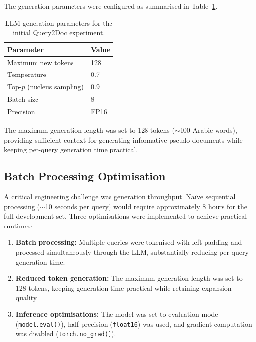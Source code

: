 The generation parameters were configured as summarised in Table~\ref{tab:q2d_params}.

\begin{table}[htbp]
    \centering
    \caption[Initial Query2Doc generation parameters]{LLM generation parameters for the initial Query2Doc experiment.}
    \label{tab:q2d_params}
    \begin{tabular}{@{}ll@{}}
        \toprule
        \textbf{Parameter} & \textbf{Value} \\
        \midrule
        Maximum new tokens & 128 \\
        Temperature & 0.7 \\
        Top-$p$ (nucleus sampling) & 0.9 \\
        Batch size & 8 \\
        Precision & FP16 \\
        \bottomrule
    \end{tabular}
\end{table}

The maximum generation length was set to 128 tokens ($\sim$100 Arabic words), providing sufficient context for generating informative pseudo-documents while keeping per-query generation time practical.

\subsection{Batch Processing Optimisation}
\label{sec:meth_q2d_batch}

A critical engineering challenge was generation throughput. Na\"ive sequential processing ($\sim$10 seconds per query) would require approximately 8 hours for the full development set. Three optimisations were implemented to achieve practical runtimes:

\begin{enumerate}
    \item \textbf{Batch processing:} Multiple queries were tokenised with left-padding and processed simultaneously through the LLM, substantially reducing per-query generation time.
    \item \textbf{Reduced token generation:} The maximum generation length was set to 128 tokens, keeping generation time practical while retaining expansion quality.
    \item \textbf{Inference optimisations:} The model was set to evaluation mode (\texttt{model.eval()}), half-precision (\texttt{float16}) was used, and gradient computation was disabled (\texttt{torch.no\_grad()}).
\end{enumerate}

